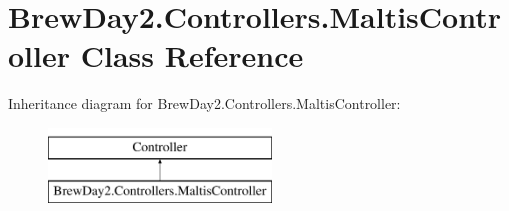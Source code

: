 \hypertarget{class_brew_day2_1_1_controllers_1_1_maltis_controller}{}\section{Brew\+Day2.\+Controllers.\+Maltis\+Controller Class Reference}
\label{class_brew_day2_1_1_controllers_1_1_maltis_controller}
Inheritance diagram for Brew\+Day2.\+Controllers.\+Maltis\+Controller\+:\begin{figure}[H]
\begin{center}
\leavevmode
\includegraphics[height=2.000000cm]{class_brew_day2_1_1_controllers_1_1_maltis_controller}
\end{center}
\end{figure}
